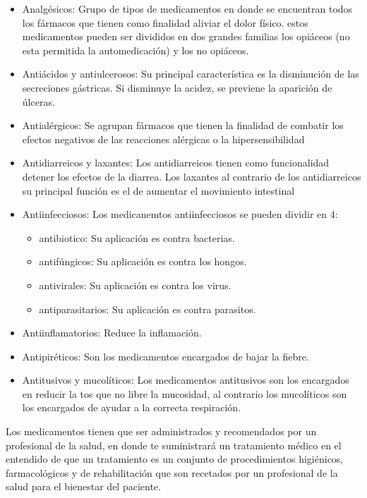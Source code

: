 \begin{itemize}
	\item Analgésicos: Grupo de tipos de medicamentos en donde se encuentran todos los fármacos que tienen como finalidad aliviar el dolor físico. estos medicamentos pueden ser divididos en dos grandes familias los opiáceos (no esta permitida la automedicación) y los no opiáceos.
		
	\item Antiácidos y antiulcerosos: Su principal característica es la disminución de las secreciones gástricas. Si disminuye la acidez, se previene la aparición de úlceras.
	
	\item Antialérgicos: Se agrupan fármacos que tienen la finalidad de combatir los efectos negativos de las reacciones alérgicas o la hipersensibilidad
	
	\item Antidiarreicos y laxantes: Los antidiarreicos tienen como funcionalidad detener los efectos de la diarrea. Los laxantes al contrario de los antidiarreicos su principal función es el de aumentar el movimiento intestinal
	
	\item Antiinfecciosos: Los medicanemtos antiinfecciosos se pueden dividir en 4:
		\begin{itemize}
			\item antibiotico: Su aplicación es contra bacterias.
			\item antifúngicos: Su aplicación es contra los hongos.
			\item antivirales: Su aplicación es contra los virus.
			\item antiparasitarios: Su aplicación es contra parasitos.
		\end{itemize}
	
	\item Antiinflamatorios: Reduce la inflamación.
	
	\item Antipiréticos: Son los medicamentos encargados de bajar la fiebre.
	
	\item Antitusivos y mucolíticos: Los medicamentos antitusivos son los encargados en reducir la tos que no libre la mucosidad, al contrario los mucolíticos son los encargados de ayudar a la correcta respiración.
	 
\end{itemize}
Los medicamentos tienen que ser administrados y recomendados por un profesional de la salud, en donde te suministrará un tratamiento médico en el entendido de que un tratamiento es un conjunto de procedimientos higiénicos, farmacológicos y de rehabilitación que son recetados por un profesional de la salud para el bienestar del paciente. 

